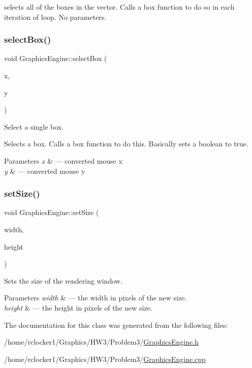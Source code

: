 selects all of the boxes in the vector. Calls a box function to do so in each iteration of loop. No parameters. \mbox{\label{class_graphics_engine_a02f488184662f6bedacfb77f38a6da64}} 
\subsubsection{\texorpdfstring{select\+Box()}{selectBox()}}
{\footnotesize\ttfamily void Graphics\+Engine\+::select\+Box (\begin{DoxyParamCaption}\item[{G\+Lfloat}]{x,  }\item[{G\+Lfloat}]{y }\end{DoxyParamCaption})}



Select a single box. 

Selects a box. Calls a box function to do this. Basically sets a boolean to true.


\begin{DoxyParams}{Parameters}
{\em x} & --- converted mouse x \\
\hline
{\em y} & --- converted mouse y \\
\hline
\end{DoxyParams}
\mbox{\label{class_graphics_engine_aac1a9cc3d195ed1f28018dffd80dae41}} 
\subsubsection{\texorpdfstring{set\+Size()}{setSize()}}
{\footnotesize\ttfamily void Graphics\+Engine\+::set\+Size (\begin{DoxyParamCaption}\item[{unsigned int}]{width,  }\item[{unsigned int}]{height }\end{DoxyParamCaption})}



Sets the size of the rendering window. 


\begin{DoxyParams}{Parameters}
{\em width} & --- the width in pixels of the new size.\\
\hline
{\em height} & --- the height in pixels of the new size. \\
\hline
\end{DoxyParams}


The documentation for this class was generated from the following files\+:\begin{DoxyCompactItemize}
\item 
/home/rclocker1/\+Graphics/\+H\+W3/\+Problem3/\hyperlink{_graphics_engine_8h}{Graphics\+Engine.\+h}\item 
/home/rclocker1/\+Graphics/\+H\+W3/\+Problem3/\hyperlink{_graphics_engine_8cpp}{Graphics\+Engine.\+cpp}\end{DoxyCompactItemize}
